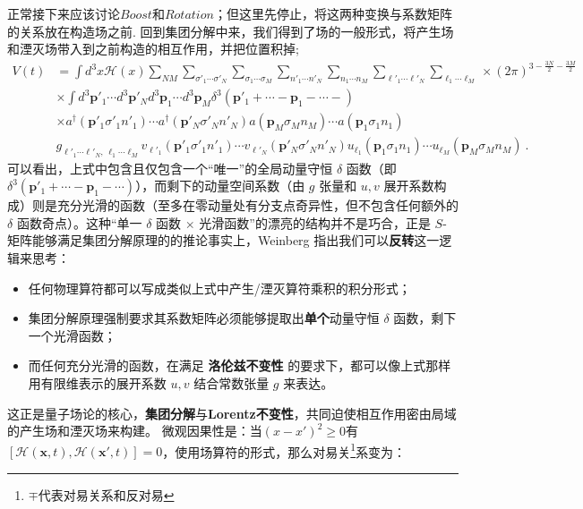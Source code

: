 正常接下来应该讨论$Boost$和$Rotation$；但这里先停止，将这两种变换与系数矩阵的关系放在构造场之前.
回到集团分解中来，我们得到了场的一般形式，将产生场和湮灭场带入到之前构造的相互作用，并把位置积掉;
\begin{equation}\label{eq_Hint_general}
\begin{aligned}
    V(t)&=\int d^3x\mathscr{H}(x)\sum_{NM} \sum_{\sigma'_1 \cdots \sigma'_N} \sum_{\sigma_1 \cdots \sigma_M} \sum_{n'_1 \cdots n'_N} \sum_{n_1 \cdots n_M} \sum_{\ell'_1 \cdots \ell'_N} \sum_{\ell_1 \cdots \ell_M}\times(2\pi)^{3 - \frac{3N}{2} - \frac{3M}{2}} \\
    &\times\int d^3\mathbf{p}'_1 \cdots d^3\mathbf{p}'_N d^3\mathbf{p}_1 \cdots d^3\mathbf{p}_M  \delta^3(\mathbf{p}'_1 + \cdots  - \mathbf{p}_1 - \cdots- ) \\
    &\times a^\dagger(\mathbf{p}'_1 \sigma'_1 n'_1) \cdots a^\dagger(\mathbf{p}'_N \sigma'_N n'_N) a(\mathbf{p}_M \sigma_M n_M) \cdots a(\mathbf{p}_1 \sigma_1 n_1) \\
    &g_{\ell'_1 \cdots \ell'_N, \, \ell_1 \cdots \ell_M}  v_{\ell'_1}(\mathbf{p}'_1 \sigma'_1 n'_1) \cdots v_{\ell'_N}(\mathbf{p}'_N \sigma'_N n'_N) u_{\ell_1}(\mathbf{p}_1 \sigma_1 n_1) \cdots u_{\ell_M}(\mathbf{p}_M \sigma_M n_M) \ .
\end{aligned}
\end{equation}
\color{blue}可以看出，上式中包含且仅包含一个“唯一”的全局动量守恒 $\delta$ 函数（即 $\delta^3(\mathbf{p}'_1 + \cdots - \mathbf{p}_1 - \cdots)$），而剩下的动量空间系数（由 $g$ 张量和 $u, v$ 展开系数构成）则是充分光滑的函数（至多在零动量处有分支点奇异性，但不包含任何额外的 $\delta$ 函数奇点）。这种“单一 $\delta$ 函数 $\times$ 光滑函数”的漂亮的结构并不是巧合，正是 $S$-矩阵能够满足集团分解原理的的推论事实上，Weinberg 指出我们可以\textbf{反转}这一逻辑来思考：
\begin{itemize}
    \item 任何物理算符都可以写成类似上式中产生/湮灭算符乘积的积分形式；
    \item 集团分解原理强制要求其系数矩阵必须能够提取出\textbf{单个}动量守恒 $\delta$ 函数，剩下一个光滑函数；
    \item 而任何充分光滑的函数，在满足 \textbf{洛伦兹不变性} 的要求下，都可以像上式那样用有限维表示的展开系数 $u, v$ 结合常数张量 $g$ 来表达。
\end{itemize}
\normalcolor
这正是量子场论的核心，\textbf{集团分解}与\textbf{Lorentz不变性}，共同迫使相互作用密由局域的产生场和湮灭场来构建。
微观因果性是：$\text{当}(x-x')^2 \ge 0$有$[\mathscr{H}(\mathbf{x},t),\mathscr{H}(\mathbf{x}',t)]=0$，使用场算符的形式，那么对易关\footnote{$\mp$代表对易关系和反对易}系变为：
